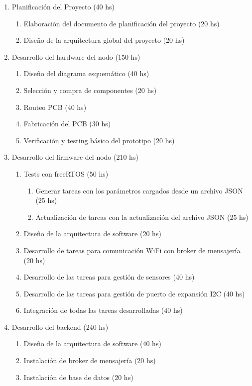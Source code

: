 \documentclass[11pt]{charter}
\begin{document}
\begin{enumerate}
\item Planificación del Proyecto (40 hs)
	\begin{enumerate}
	\item Elaboración del documento de planificación del proyecto (20 hs)
	\item Diseño de la arquitectura global del proyecto (20 hs)
	\end{enumerate}
\item Desarrollo del hardware del nodo (150 hs)
	\begin{enumerate}
	\item Diseño del diagrama esquemático (40 hs)
	\item Selección y compra de componentes (20 hs)
	\item Routeo PCB (40 hs)
	\item Fabricación del PCB (30 hs)
	\item Verificación y testing básico del prototipo (20 hs)
	\end{enumerate}
\item Desarrollo del firmware del nodo (210 hs)
	\begin{enumerate}
	\item Tests con freeRTOS (50 hs)
		\begin{enumerate}
		\item Generar tareas con los parámetros cargados desde un archivo JSON (25 hs)
		\item Actualización de tareas con la actualización del archivo JSON (25 hs)
		\end{enumerate}
	\item Diseño de la arquitectura de software (20 hs)
	\item Desarrollo de tareas para comunicación WiFi con broker de mensajería (20 hs)
	\item Desarrollo de las tareas para gestión de sensores (40 hs)
	\item Desarrollo de las tareas para gestión de puerto de expansión I2C (40 hs)
	\item Integración de todas las tareas desarrolladas (40 hs)
	\end{enumerate}
\item Desarrollo del backend (240 hs)
\begin{enumerate}
	\item Diseño de la arquitectura de software (40 hs)
	\item Instalación de broker de mensajería (20 hs)
	\item Instalación de base de datos (20 hs)

\end{enumerate}
\end{enumerate}
\end{document}

